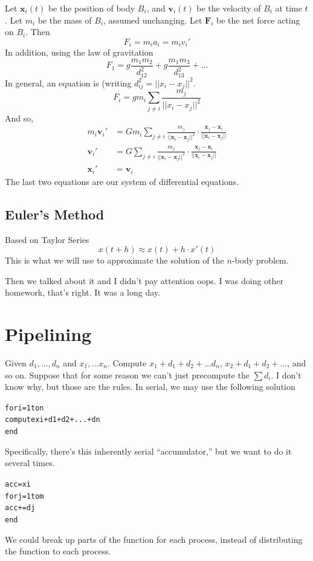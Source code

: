 \documentclass[12pt]{article}
\numberwithin{equation}{section}
\newcommand{\vect}[1] {\mathbf{#1}} %
\newcommand{\magn}[1]{\lvert\lvert#1\rvert\rvert} %
\theoremstyle{theorem}
\theoremstyle{definition}
\theoremstyle{remark}
\begin{document}
Let $\vect{x}_i(t)$ be the position of body $B_i$, and $\vect{v}_i(t)$ be the velocity of $B_i$ at time $t$.  Let $m_i$ be the mass of $B_i$, assumed unchanging.  Let $\vect{F}_i$ be the net force acting on $B_i$. Then
\begin{equation}
F_i = m_ia_i = m_iv_i'
\end{equation}
In addition, using the law of gravitation
\begin{equation}
F_1 = g\frac{m_1m_2}{d_{12}^2} + g\frac{m_1m_3}{d_{13}^2} + \dots
\end{equation}
In general, an equation is (writing $d_{ij}^2 = \magn{x_i - x_j}^2$.
\begin{equation}
F_i = gm_i \sum_{j\neq i} \frac{m_j}{\magn{x_i - x_j}^2}
\end{equation}
And so,
\begin{align}
m_i\vect{v}_i' &= Gm_i \sum_{j\neq i} \frac{m_j}{\magn{\vect{x}_i - \vect{x}_j}^2}\cdot\frac{\vect{x}_j - \vect{x}_i}{\magn{\vect{x}_i - \vect{x}_j}} \\
\vect{v}_i' &= G \sum_{j\neq i} \frac{m_j}{\magn{\vect{x}_i - \vect{x}_j}^2}\cdot\frac{\vect{x}_j - \vect{x}_i}{\magn{\vect{x}_i - \vect{x}_j}} \\
\vect{x}_i' &= \vect{v}_i
\end{align}
The last two equations are our system of differential equations. 

\subsection{Euler's Method}
Based on Taylor Series
\begin{equation}
x(t+h) \approx x(t) + h\cdot x'(t)
\end{equation}
This is what we will use to approximate the solution of the $n$-body problem. 

Then we talked about it and I didn't pay attention oops. I was doing other homework, that's right.  It was a long day.

\section{Pipelining}
\date{April 27, 2015}
Given $d_1, \dots, d_n$ and $x_1, \dots x_n$.  Compute $x_1 + d_1 + d_2 + \dots d_n$, $x_2 + d_1 + d_2 + \dots$, and so on.  Suppose that for some reason we can't just precompute the $\sum d_i$.  I don't know why, but those are the rules.  In serial, we may use the following solution
\begin{alltt}
for i = 1 to n
  compute xi + d1 + d2 + ... + dn
end
\end{alltt}
Specifically, there's this inherently serial ``accumulator,'' but we want to do it several times.  
\begin{alltt}
acc = xi
for j = 1 to m
  acc += dj
end
\end{alltt}
We could break up parts of the function for each process, instead of distributing the function to each process.
\end{document}

